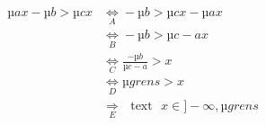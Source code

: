 \begin{align}
µ{a}x-µ{b}>µ{c}x & \underset{A}\Leftrightarrow -µ{b}>µ{c}x-µ{a}x\\
& \underset{B}\Leftrightarrow -µ{b}>µ{c-a}x \\ 
& \underset{C}\Leftrightarrow \frac{-µ{b}}{µ{c-a}}>x \\
& \underset{D}\Leftrightarrow µ{grens}>x\\
  & \underset{E}\Rightarrow \text{ {text} } x \in ]-\infty,µ{grens}
\end{align}
